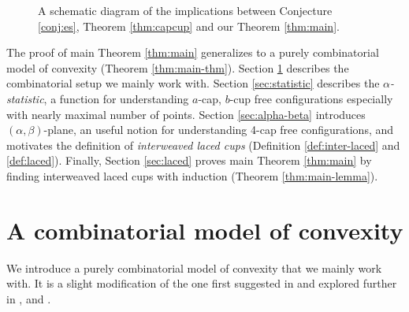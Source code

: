 \documentclass{amsart}
\theoremstyle{definition}
\numberwithin{thm}{section}
\begin{document}
\begin{center}
\begin{figure}[h]
{
}
\caption{A schematic diagram of the implications between Conjecture \ref{conj:es}, Theorem \ref{thm:capcup} and our Theorem \ref{thm:main}.}
\label{fig:pyramid}
\end{figure}
\end{center}

The proof of main Theorem \ref{thm:main} generalizes to a purely combinatorial model of convexity (Theorem \ref{thm:main-thm}). 
Section \ref{sec:set} describes the combinatorial setup we mainly work with.
Section \ref{sec:statistic} describes the \emph{$\alpha$-statistic}, a function for understanding $a$-cap, $b$-cup free configurations especially with nearly maximal number of points.
Section \ref{sec:alpha-beta} introduces $(\alpha, \beta)$-plane, an useful notion for understanding 4-cap free configurations, 
and motivates the definition of \emph{interweaved laced cups} (Definition \ref{def:inter-laced} and \ref{def:laced}).
Finally, Section \ref{sec:laced} proves main Theorem \ref{thm:main} by finding interweaved laced cups with induction (Theorem \ref{thm:main-lemma}). 

\section{A combinatorial model of convexity}
\label{sec:set}
We introduce a purely combinatorial model of convexity that we mainly work with. It is a slight modification of the one first suggested in \cite{szekeres2006computer} and explored further in \cite{fox2012erdHos}, \cite{moshkovitz2014ramsey} and \cite{balko2017sat}.
\end{document}
